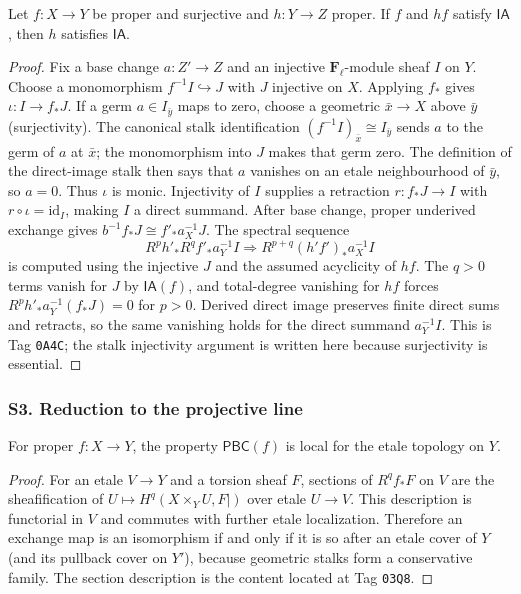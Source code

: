 \begin{lemma}
\label{lemma:weil-pbc-cancellation}
\uses{}

Let $f:X\to Y$ be proper and surjective and $h:Y\to Z$ proper.  If $f$ and
$hf$ satisfy $\mathsf{IA}$, then $h$ satisfies $\mathsf{IA}$.
\end{lemma}
\begin{proof}

Fix a base change $a:Z'\to Z$ and an injective $\mathbf F_\ell$-module sheaf
$I$ on $Y$.  Choose a
  monomorphism $f^{-1}I\hookrightarrow J$ with $J$ injective on $X$.  Applying
$f_*$ gives $\iota:I\to f_*J$.  If a germ $a\in I_{\bar y}$ maps to zero,
choose a geometric $\bar x\to X$ above $\bar y$ (surjectivity).  The canonical
stalk identification $(f^{-1}I)_{\bar x}\cong I_{\bar y}$ sends $a$ to the
germ of $a$ at $\bar x$; the monomorphism into $J$ makes that germ zero.  The
definition of the direct-image stalk then says that $a$ vanishes on an etale
neighbourhood of $\bar y$, so $a=0$.  Thus $\iota$ is monic.  Injectivity of $I$ supplies a retraction
$r:f_*J\to I$ with $r\circ\iota=\mathrm{id}_I$, making $I$ a direct summand.
After base change, proper underived exchange gives
$b^{-1}f_*J\cong f'_*a_X^{-1}J$.  The spectral sequence
\[
R^ph'_*R^qf'_*a_Y^{-1}I\Longrightarrow R^{p+q}(h'f')_*a_X^{-1}I
\]
is computed using the injective $J$ and the assumed acyclicity of $hf$.
The $q>0$ terms vanish for $J$ by $\mathsf{IA}(f)$, and total-degree
vanishing for $hf$ forces $R^ph'_*a_Y^{-1}(f_*J)=0$ for $p>0$.  Derived
direct image preserves finite direct sums and retracts, so the same vanishing
holds for the direct summand $a_Y^{-1}I$.  This is Tag \texttt{0A4C}; the
stalk injectivity argument is written here because surjectivity is essential.
\end{proof}

\subsubsection{S3. Reduction to the projective line}

\begin{lemma}
\label{lemma:weil-pbc-target-locality}
For proper $f:X\to Y$, the property $\mathsf{PBC}(f)$ is local for the etale
topology on $Y$.
\end{lemma}
\begin{proof}
\uses{} 
For an etale $V\to Y$ and a torsion sheaf $F$, sections of $R^qf_*F$ on $V$
are the sheafification of $U\mapsto H^q(X\times_YU,F|)$ over etale
$U\to V$.  This description is functorial in $V$ and commutes with further
etale localization.  Therefore an exchange map is an isomorphism if and
only if it is so after an etale cover of $Y$ (and its pullback cover on
$Y'$), because geometric stalks form a conservative family.  The section
description is the content located at Tag \texttt{03Q8}.
\end{proof}

